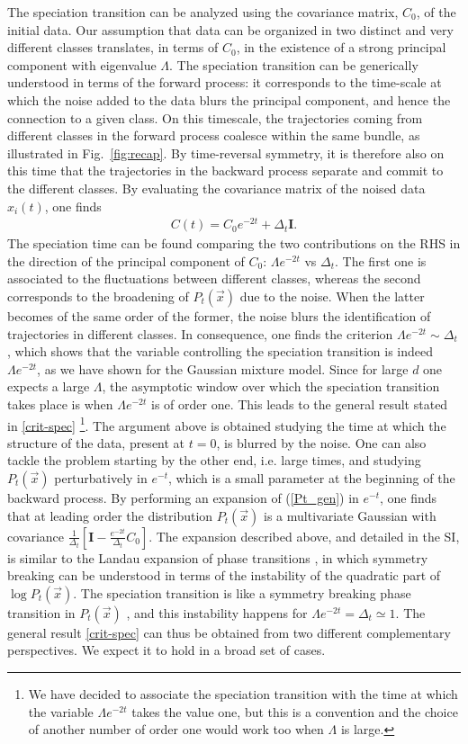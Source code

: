 \documentclass[10pt,twocolumn]{article}
\begin{document}
The speciation transition can be analyzed using the covariance matrix, $ C_0$, of the initial data. Our assumption that data can be organized in two distinct and very different classes translates, in terms of $C_0$, in the existence of a strong principal component with eigenvalue $\Lambda$. The speciation transition can be generically understood in terms of the forward process: it corresponds to the time-scale at which the noise added to the data blurs the principal component, and hence the connection to a given class. On this timescale, the trajectories coming from different classes in the forward process coalesce within the same bundle, as illustrated in Fig.~\ref{fig:recap}. By time-reversal symmetry, it is therefore also on this time that the trajectories in the backward process separate and  commit to the different classes. 
By evaluating the covariance matrix of the noised data $x_i(t)$, one finds 
\begin{align}
    C(t)=C_0 e^{-2t}+\Delta_t {\mathbf I}.
\end{align}
The speciation time can be found comparing the two contributions on the RHS in the direction of the principal component of $ C_0$: $\Lambda e^{-2t}$ vs $\Delta_t$. The first one is associated to the fluctuations between different classes, whereas the second corresponds to the broadening of $P_t(\vec x)$ due to the noise. When the latter becomes of the same order of the former, the noise blurs the identification of trajectories in different classes. In consequence, one finds the criterion $\Lambda e^{-2t}\sim \Delta_t$, which shows that the variable controlling the speciation transition is indeed $\Lambda e^{-2t}$, as we have shown for the Gaussian mixture model.  Since for large $d$ one expects a large $\Lambda$, the asymptotic window over which the speciation transition takes place is when  
$\Lambda e^{-2t}$ is of order one. This leads to the general result stated in \eqref{crit-spec} \footnote{We have decided to associate the speciation transition with the time at which the variable $\Lambda e^{-2t}$ takes the value one, but this is a convention and the choice of another number of order one would work too when $\Lambda$ is large.}.
The argument above is obtained studying the time at which the structure of the data, present at $t=0$, is blurred by the noise. One can also tackle the problem starting by the other end, i.e. large times, and studying $P_t(\vec x)$ perturbatively in $e^{-t}$, which is a small parameter at the beginning of the backward process. By performing an expansion of (\ref{Pt_gen}) in $e^{-t}$, one finds that at leading order the distribution $P_t(\vec x)$ is a multivariate Gaussian with covariance $\frac{1}{\Delta_t}\left[{\mathbf I}-\frac{e^{-2t}}{\Delta_t}C_0\right]$. The expansion described above, and detailed in the SI, is similar to the Landau expansion of phase transitions \cite{LE}, in which symmetry breaking can be understood in terms of the instability of the quadratic part of $\log P_t(\vec x)$.
The speciation transition is like a symmetry breaking phase transition in $P_t(\vec x)$ \cite{GBM,ambrogioni}, and this instability happens for $\Lambda e^{-2t}=\Delta_t\simeq 1$. The general result \eqref{crit-spec} can thus be obtained from two different complementary perspectives. We expect it to hold in a broad set of cases. 
\end{document}
